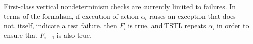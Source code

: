 First-class vertical nondeterminism checks are currently
limited to failures.  
In terms of the formalism, if execution of action
$\alpha_i$ raises an exception that does not, itself, indicate a test failure, then 
    $F_i$ is true, and TSTL repeats $\alpha_i$ in order to ensure that
    $F_{i+1}$ is also true.


\begin{comment}
\subsection{Tools for Nondeterministic Delta-Debugging}
\label{sec:ddimp}

Unlike the other additions, explicitly designed for nondeterminism
detection, the {\tt P} query, {\tt forceP} wrapper, and {\tt --probability}, {\tt
  --samples}, and {\tt --replications} reducer options are general
tools for use with nondeterministic predicates in delta-debugging.  Of
course, nondeterminism and flakiness are the most common probabilistic
test properties we are aware of, but in theory these tools can be used
for other probabilistic debugging problems (e.g., if the property of
interest is that a value is above a certain threshold in 90\% of test
executions, these TSTL additions can be used to find a small test where this property
fails to hold).  In addition to the basic probabilistic reduction
issues discussed above, actual implementation of test reduction for
nondeterminism introduces some subtle issues.  By default, for
example, TSTL automatically removed non-enabled actions from tests
during reduction, because these are never actually executed.  However,
in timing based nondeterminism, such steps may be essential to
causing the nondeterminism to appear (we had to turn off this feature
for the {\tt redis-py} example discussed below).

\subsection{Key Challenges}
The key challenge in all of these implementations was choosing
appropriate default values.  In particular, how many times to retry
tests (horizontal determinism) or actions (vertical/failure determinism), what delays to use, and numbers of replications
required in nondeterministic delta-debugging.  Because our confidence
that these defaults are ideal is low, we made it easy to change the
values used, as shown by the presence of command line options and
optional function parameters in Tables \ref{tab:methods} and
\ref{tab:options}.
\end{comment}

